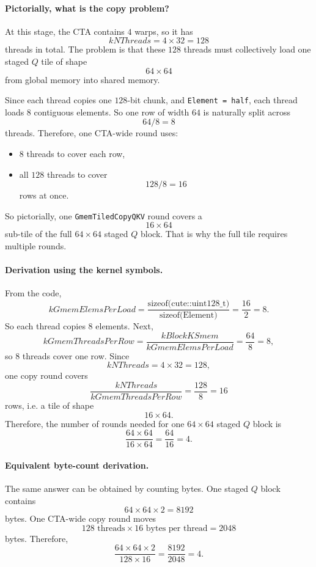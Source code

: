 \documentclass[11pt]{article}
\begin{document}
\paragraph{Pictorially, what is the copy problem?}
At this stage, the CTA contains $4$ warps, so it has
\[
kNThreads = 4 \times 32 = 128
\]
threads in total. The problem is that these $128$ threads must collectively
load one staged $Q$ tile of shape
\[
64 \times 64
\]
from global memory into shared memory.

Since each thread copies one $128$-bit chunk, and \texttt{Element = half}, each
thread loads $8$ contiguous elements. So one row of width $64$ is naturally
split across
\[
64 / 8 = 8
\]
threads. Therefore, one CTA-wide round uses:
\begin{itemize}
    \item $8$ threads to cover each row,
    \item all $128$ threads to cover
    \[
    128 / 8 = 16
    \]
    rows at once.
\end{itemize}

So pictorially, one \texttt{GmemTiledCopyQKV} round covers a
\[
16 \times 64
\]
sub-tile of the full $64 \times 64$ staged $Q$ block. That is why the full
tile requires multiple rounds.

\paragraph{Derivation using the kernel symbols.}
From the code,
\[
kGmemElemsPerLoad
=
\frac{\text{sizeof(cute::uint128\_t)}}{\text{sizeof(Element)}}
=
\frac{16}{2}
=
8.
\]
So each thread copies $8$ elements. Next,
\[
kGmemThreadsPerRow
=
\frac{kBlockKSmem}{kGmemElemsPerLoad}
=
\frac{64}{8}
=
8,
\]
so $8$ threads cover one row. Since
\[
kNThreads = 4 \times 32 = 128,
\]
one copy round covers
\[
\frac{kNThreads}{kGmemThreadsPerRow}
=
\frac{128}{8}
=
16
\]
rows, i.e. a tile of shape
\[
16 \times 64.
\]
Therefore, the number of rounds needed for one $64 \times 64$ staged $Q$ block
is
\[
\frac{64 \times 64}{16 \times 64}
=
\frac{64}{16}
=
4.
\]

\paragraph{Equivalent byte-count derivation.}
The same answer can be obtained by counting bytes. One staged $Q$ block contains
\[
64 \times 64 \times 2 = 8192
\]
bytes. One CTA-wide copy round moves
\[
128 \text{ threads} \times 16 \text{ bytes per thread} = 2048
\]
bytes. Therefore,
\[
\frac{64 \times 64 \times 2}{128 \times 16}
=
\frac{8192}{2048}
=
4.
\]
\end{document}
